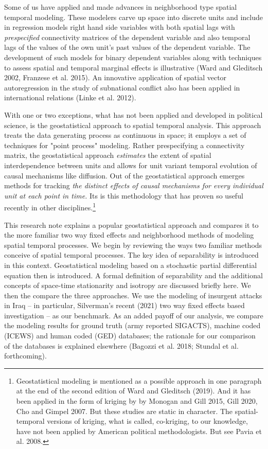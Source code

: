 \documentclass[12pt]{article}
\begin{document}
Some of us have applied and made advances in neighborhood type spatial temporal
modeling. These modelers carve up space into discrete units and include in regression
models right hand side variables with both spatial lags with \emph{prespecified}
connectivity matrices of the dependent variable and also
temporal lags of the values of the own unit's past values
of the dependent variable. The development of such models for binary dependent
variables along with techniques to assess spatial and temporal marginal effects
is illustrative (Ward and Gleditsch 2002, Franzese et al. 2015). An innovative application
of spatial vector autoregression in the study of subnational conflict also has
been applied in international relations (Linke et al. 2012).

With one or two exceptions, what has not been applied and developed in political science,
is the  geostatistical approach to spatial temporal analysis. This approach treats
the data generating process as continuous in space; it employs a set of techniques
for "point process" modeling. Rather prespecifying a connectivity matrix, the
geostatistical approach \emph{estimates} the extent of spatial interdependence
between units and allows for unit variant temporal evolution of causal mechanisms
like diffusion. Out of the geostatistical approach emerges methods for tracking
\textit {the distinct effects of causal mechanisms for every individual unit at each point
in time.} Its is this methodology that has proven so useful recently in other
disciplines.\footnote{Geostatistical modeling is mentioned as a possible
approach in one paragraph at the end of the second edition of Ward and Gleditsch
(2019). And it has been applied in the form of kriging by
by Monogan and Gill 2015, Gill 2020, Cho and Gimpel 2007. But these studies are
static in character. The spatial-temporal versions of kriging, what is
called, co-kriging, to our knowledge,
have not been applied by American political methodologists. But see
Pavia et al. 2008.}

This research note explains a popular geostatistical approach and compares it to
the more familiar two way fixed effects and neighborhood methods of modeling
spatial temporal processes. We begin by reviewing the ways two familiar
methods conceive of spatial temporal processes. The key idea of
separability is introduced in this context. Geostatistical modeling based
on a stochastic partial differential equation then is introduced.
A formal definition of separability and the additional concepts of
space-time stationarity and isotropy are discussed briefly here.
 We then the compare the three approaches. We
use the modeling of insurgent attacks in Iraq -- in particular, Silverman's
recent (2021) two way fixed effects based investigation -- as our benchmark.
As an added payoff of our analysis, we compare the modeling results for
ground truth (army reported SIGACTS), machine coded (ICEWS) and human
coded (GED) databases; the rationale for our comparison of the databases
is explained elsewhere (Bagozzi et al. 2018; Stundal et al. forthcoming).
\end{document}
